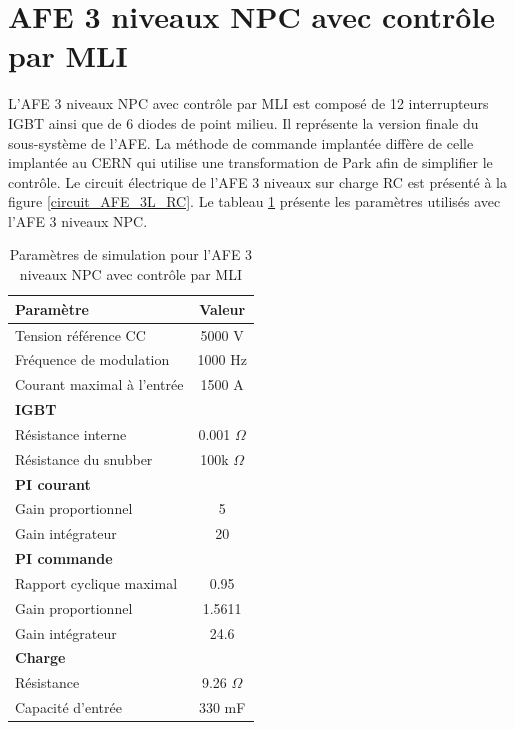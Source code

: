 \clearpage
\section{AFE 3 niveaux NPC avec contrôle par MLI}
L'AFE 3 niveaux NPC avec contrôle par MLI est composé de 12 interrupteurs IGBT ainsi que de 6 diodes de point milieu. Il représente la version finale du sous-système de l'AFE. La méthode de commande implantée diffère de celle implantée au CERN qui utilise une transformation de Park afin de simplifier le contrôle. Le circuit électrique de l'AFE 3 niveaux sur charge RC est présenté à la figure \ref{circuit_AFE_3L_RC}. Le tableau \ref{p_AF_3level} présente les paramètres utilisés avec l'AFE 3 niveaux NPC.


\begin{table}[htb]
\centering
\begin{tabular}{|l|c|} 
  \hline
  \textbf{Paramètre} & \textbf{Valeur}  \\
  \hline\hline
  Tension référence CC & 5000 V\\ \hline
  Fréquence de modulation & 1000 Hz \\ \hline
  Courant maximal à l'entrée& 1500 A \\ \hline \hline
  \multicolumn{2}{|l|}{\textbf{IGBT}}\\ \hline
  Résistance interne & 0.001 $\Omega$\\
  Résistance du snubber & 100k $\Omega$\\ \hline \hline
   \multicolumn{2}{|l|}{\textbf{PI courant}}\\ \hline
  Gain proportionnel & 5 \\
  Gain intégrateur & 20 \\ \hline \hline
  \multicolumn{2}{|l|}{\textbf{PI commande}}\\ \hline
  Rapport cyclique maximal & 0.95\\
  Gain proportionnel & 1.5611 \\
  Gain intégrateur & 24.6 \\ \hline \hline
  \multicolumn{2}{|l|}{\textbf{Charge}}\\ \hline
  Résistance & 9.26 $\Omega$ \\
  Capacité d'entrée & 330 mF\\
  \hline
\end{tabular}
\caption{Paramètres de simulation pour l'AFE 3 niveaux NPC avec contrôle par MLI}
\label{p_AF_3level}
\end{table}

